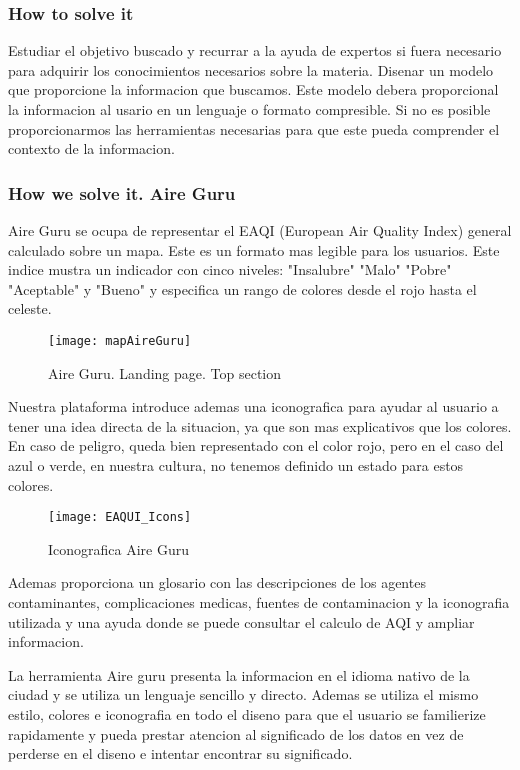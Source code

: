\subsubsection{How to solve it} 
Estudiar el objetivo buscado y recurrar a la ayuda de expertos si fuera necesario para adquirir los conocimientos necesarios
sobre la materia. Disenar un modelo que proporcione la informacion que buscamos. Este modelo debera proporcional la informacion 
al usario en un lenguaje o formato compresible. Si no es posible proporcionarmos las herramientas necesarias para que este pueda 
comprender el contexto de la informacion.

\subsubsection{How we solve it. Aire Guru} 
Aire Guru se ocupa de representar el EAQI (European Air Quality Index) general calculado sobre un mapa. Este es un formato mas legible para los usuarios.
Este indice mustra un indicador con cinco niveles: "Insalubre" "Malo" "Pobre" "Aceptable" y "Bueno" y especifica un rango de colores desde el rojo hasta el celeste.\\
\newpage
\begin{figure}[ht]
    \centering
    \texttt{[image: mapAireGuru]}
    \caption{Aire Guru. Landing page. Top section}
\end{figure}

Nuestra plataforma introduce ademas una iconografica para ayudar al usuario a tener una idea directa de la situacion, ya que son mas 
explicativos que los colores. En caso de peligro, queda bien representado con el color rojo, pero en el caso del azul o verde, en nuestra cultura, no
tenemos definido un estado para estos colores.\\
\begin{figure}[ht]
    \centering
    \texttt{[image: EAQUI\_Icons]}
    \caption{Iconografica Aire Guru}
\end{figure}

Ademas proporciona un glosario con las descripciones de los agentes contaminantes, complicaciones medicas, fuentes de contaminacion
y la iconografia utilizada y una ayuda donde se puede consultar el calculo de AQI y ampliar informacion.

La herramienta Aire guru presenta la informacion en el idioma nativo de la ciudad y se utiliza un lenguaje sencillo y directo.
Ademas se utiliza el mismo estilo, colores e iconografia en todo el diseno para que el usuario se familierize rapidamente y pueda
prestar atencion al significado de los datos en vez de perderse en el diseno e intentar encontrar su significado.


